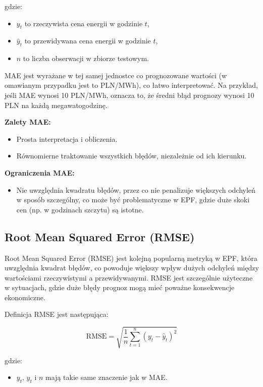gdzie:
\begin{itemize}
    \item \( y_t \) to rzeczywista cena energii w godzinie \( t \),
    \item \( \hat{y}_t \) to przewidywana cena energii w godzinie \( t \),
    \item \( n \) to liczba obserwacji w zbiorze testowym.
\end{itemize}

MAE jest wyrażane w tej samej jednostce co prognozowane wartości (w omawianym przypadku jest to PLN/MWh), co łatwo interpretować. Na przykład, jeśli MAE wynosi 10 PLN/MWh, oznacza to, że średni błąd prognozy wynosi 10 PLN na każdą megawatogodzinę.

\textbf{Zalety MAE:}
\begin{itemize}
    \item Prosta interpretacja i obliczenia.
    \item Równomierne traktowanie wszystkich błędów, niezależnie od ich kierunku.
\end{itemize}

\textbf{Ograniczenia MAE:}
\begin{itemize}
    \item Nie uwzględnia kwadratu błędów, przez co nie penalizuje większych odchyleń w sposób szczególny, co może być problematyczne w EPF, gdzie duże skoki cen (np. w godzinach szczytu) są istotne.
\end{itemize}

\subsection{Root Mean Squared Error (RMSE)}
\label{subsec:rmse}

Root Mean Squared Error (RMSE) jest kolejną popularną metryką w EPF, która uwzględnia kwadrat błędów, co powoduje większy wpływ dużych odchyleń między wartościami rzeczywistymi a przewidywanymi. RMSE jest szczególnie użyteczne w sytuacjach, gdzie duże błędy prognoz mogą mieć poważne konsekwencje ekonomiczne.

Definicja RMSE jest następująca:

\[
\text{RMSE} = \sqrt{\frac{1}{n} \sum_{t=1}^{n} \left( y_t - \hat{y}_t \right)^2}
\]

gdzie:
\begin{itemize}
    \item \( y_t \), \( \hat{y}_t \) i \( n \) mają takie same znaczenie jak w MAE.
\end{itemize}

